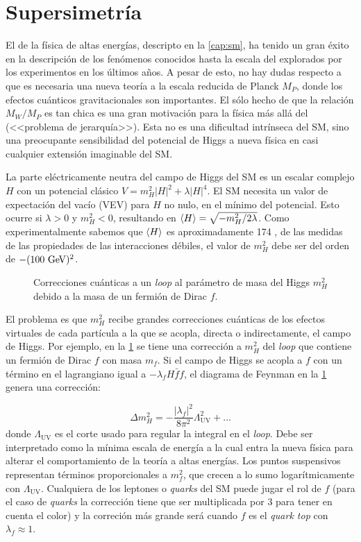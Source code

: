 \section{Supersimetría}
\label{cap:susy}

El {\SM} de la física de altas energías, descripto en la \cref{cap:sm}, ha
tenido un gran éxito en la descripción de los fenómenos conocidos hasta la
escala del {\tev} explorados por los experimentos en los últimos a\~nos. A pesar
de esto, no hay dudas respecto a que es necesaria una nueva teoría a la escala
reducida de Planck $M_P$, donde los efectos cuánticos gravitacionales son
importantes. El sólo hecho de que la relación $M_W/M_P$ es tan chica es una
gran motivación para la física más allá del {\SM} (<<problema de jerarquía>>).
Esta no es una dificultad intrínseca del SM, sino una
preocupante sensibilidad del potencial de Higgs a nueva física en casi cualquier
extensión imaginable del SM.

La parte eléctricamente neutra del campo de Higgs del SM es un escalar complejo
$H$ con un potencial clásico $V=m_H^2 |H|^2 + \lambda|H|^4$. El SM necesita un
valor de expectación del vacío (VEV) para $H$ no nulo, en el mínimo del potencial.
Esto ocurre si $\lambda>0$ y $m_H^2<0$, resultando en $\langle H \rangle =
\sqrt{-m_H^2/2\lambda}$. Como experimentalmente sabemos que $\langle H \rangle$ es
aproximadamente 174 \gev, de las medidas de las propiedades de las interacciones
débiles, el valor de $m_H^2$ debe ser del orden de $-(100 \gev)^2$.

\begin{figure}[!h]
  \centering 
  \caption{Correcciones cuánticas a un \emph{loop} al parámetro de masa del Higgs
    $m_H^2$ debido a la masa de un fermión de Dirac $f$.}
  \label{fig:higgs_corr_f}
\end{figure}

El problema es que $m_H^2$ recibe grandes correcciones cuánticas de los efectos
virtuales de cada partícula a la que se acopla, directa o indirectamente, el
campo de Higgs. Por ejemplo, en la \cref{fig:higgs_corr_f} se tiene una
corrección a $m_H^2$ del \emph{loop} que contiene un fermión de Dirac $f$ con masa
$m_f$. Si el campo de Higgs se acopla a $f$ con un término en el lagrangiano
igual a $-\lambda_f H \bar{f}f$, el diagrama de Feynman en la \cref{fig:higgs_corr_f} genera una corrección:

\begin{equation}
  \Delta m_H^2 = -\frac{|\lambda_f|^2}{8\pi^2} \Lambda^2_{\text{UV}} + \ldots
  \label{eq:higgs_corr_f}
\end{equation}
%
donde $\Lambda_\text{UV}$ es el corte usado para regular la integral en el
\emph{loop}. Debe ser interpretado como la m\'inima escala de energ\'ia a la
cual entra la nueva física para alterar el comportamiento de la teoría a altas
energías. Los puntos suspensivos representan términos proporcionales a $m_f^2$,
que crecen a lo sumo logarítmicamente con $\Lambda_\text{UV}$. Cualquiera de los
leptones o \emph{quarks} del SM puede jugar el rol de $f$ (para el caso de \emph{quarks} la
corrección tiene que ser multiplicada por 3 para tener en cuenta el color) y
la correción más grande será cuando $f$ es el \emph{quark top} con
$\lambda_f \approx 1$.

